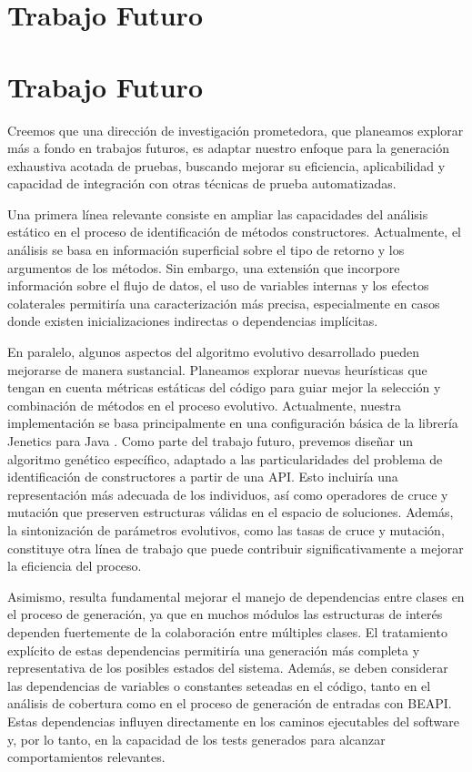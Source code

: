 \chapter{Trabajo Futuro}
\label{cap:future}

\chapter{Trabajo Futuro}

Creemos que una dirección de investigación prometedora, que planeamos explorar más a fondo en trabajos futuros, 
es adaptar nuestro enfoque para la generación exhaustiva acotada de pruebas, buscando mejorar su eficiencia, aplicabilidad y capacidad de integración con otras técnicas de prueba automatizadas.

Una primera línea relevante consiste en ampliar las capacidades del análisis estático en el proceso de identificación de métodos constructores. 
Actualmente, el análisis se basa en información superficial sobre el tipo de retorno y los argumentos de los métodos. 
Sin embargo, una extensión que incorpore información sobre el flujo de datos, el uso de variables internas y los efectos colaterales permitiría una caracterización más precisa, 
especialmente en casos donde existen inicializaciones indirectas o dependencias implícitas.

En paralelo, algunos aspectos del algoritmo evolutivo desarrollado pueden mejorarse de manera sustancial. 
Planeamos explorar nuevas heurísticas que tengan en cuenta métricas estáticas del código para guiar mejor la selección y combinación de métodos en el proceso evolutivo. 
Actualmente, nuestra implementación se basa principalmente en una configuración básica de la librería Jenetics para Java \cite{jenetics}. 
Como parte del trabajo futuro, prevemos diseñar un algoritmo genético específico, adaptado a las particularidades del problema de identificación de constructores a partir de una API. 
Esto incluiría una representación más adecuada de los individuos, así como operadores de cruce y mutación que preserven estructuras válidas en el espacio de soluciones. 
Además, la sintonización de parámetros evolutivos, como las tasas de cruce y mutación, constituye otra línea de trabajo que puede contribuir significativamente a mejorar la eficiencia del proceso.

Asimismo, resulta fundamental mejorar el manejo de dependencias entre clases en el proceso de generación, 
ya que en muchos módulos las estructuras de interés dependen fuertemente de la colaboración entre múltiples clases. 
El tratamiento explícito de estas dependencias permitiría una generación más completa y representativa de los posibles estados del sistema. 
Además, se deben considerar las dependencias de variables o constantes seteadas en el código, tanto en el análisis de cobertura como en el proceso de generación de entradas con BEAPI. 
Estas dependencias influyen directamente en los caminos ejecutables del software y, por lo tanto, en la capacidad de los tests generados para alcanzar comportamientos relevantes.

